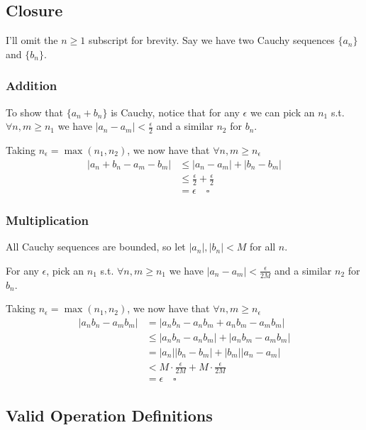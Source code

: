 \documentclass[12pt]{article}
\begin{document}
\subsection{Closure}

I'll omit the $n \ge 1$ subscript for brevity.
Say we have two Cauchy sequences $\{a_n\}$ and $\{b_n\}$.

\subsubsection{Addition}

To show that $\{a_n+b_n\}$ is Cauchy, notice that for any $\epsilon$
we can pick an $n_1$ s.t. $\forall n, m \ge n_1$ we have $|a_n-a_m| < \frac{\epsilon}{2}$
and a similar $n_2$ for $b_n$.

Taking $n_\epsilon = \max(n_1, n_2)$,
we now have that $\forall n, m \ge n_\epsilon$
\begin{align*}
  |a_n+b_n - a_m-b_m|
   & \le |a_n-a_m| + |b_n-b_m|                   \\
   & \le \frac{\epsilon}{2} + \frac{\epsilon}{2} \\
   & = \epsilon\quad\square
\end{align*}

\subsubsection{Multiplication}

All Cauchy sequences are bounded, so let $|a_n|, |b_n| < M$ for all $n$.

For any $\epsilon$, pick an $n_1$ s.t. $\forall n, m \ge n_1$
we have $|a_n-a_m| < \frac{\epsilon}{2M}$ and a similar $n_2$ for $b_n$.

Taking $n_\epsilon = \max(n_1, n_2)$,
we now have that $\forall n, m \ge n_\epsilon$
\begin{align*}
  |a_nb_n - a_mb_m|
   & = |a_nb_n - a_nb_m + a_nb_m - a_mb_m|                       \\
   & \le |a_nb_n - a_nb_m| + |a_nb_m - a_mb_m|                   \\
   & = |a_n||b_n - b_m| + |b_m||a_n - a_m|                       \\
   & < M \cdot \frac{\epsilon}{2M} + M \cdot \frac{\epsilon}{2M} \\
   & = \epsilon\quad\square
\end{align*}

\subsection{Valid Operation Definitions}
\end{document}
